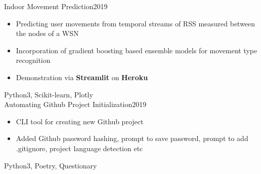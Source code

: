 \begin{projects}
	\project
	{Indoor Movement Prediction}{2019}
	{}
	{\vspace{-3mm}
	\begin{itemize}
	    \item Predicting user movements from temporal streams of RSS measured between the nodes of a WSN
	    \item Incorporation of gradient boosting based ensemble models for movement type recognition
	    \item Demonstration via \textbf{Streamlit} on \textbf{Heroku}
	\end{itemize}
	}
	{Python3, Scikit-learn, Plotly}\\
	
	
	\project
	{Automating Github Project Initialization}{2019}
	{}
	{\vspace{-3mm}
	\begin{itemize}
	    \item CLI tool for creating new Github project
	    \item Added Github password hashing, prompt to save password, prompt to add .gitignore, project language detection etc
	\end{itemize}
	}
	{Python3, Poetry, Questionary}\\
	

	
	
\end{projects}

